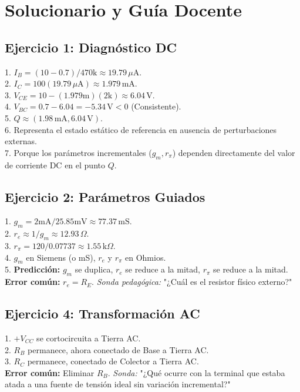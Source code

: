 \documentclass[11pt, a4paper]{article}
\begin{document}
\section*{Solucionario y Guía Docente}

\subsection*{Ejercicio 1: Diagnóstico DC}
1. $I_B = (10 - 0.7) / 470\text{k} \approx 19.79\,\mu\text{A}$. \\
2. $I_C = 100(19.79\,\mu\text{A}) \approx 1.979\,\text{mA}$. \\
3. $V_{CE} = 10 - (1.979\text{m})(2\text{k}) \approx 6.04\,\text{V}$. \\
4. $V_{BC} = 0.7 - 6.04 = -5.34\,\text{V} < 0$ (Consistente). \\
5. $Q \approx (1.98\,\text{mA}, 6.04\,\text{V})$. \\
6. Representa el estado estático de referencia en ausencia de perturbaciones externas. \\
7. Porque los parámetros incrementales ($g_m, r_\pi$) dependen directamente del valor de corriente DC en el punto $Q$.

\subsection*{Ejercicio 2: Parámetros Guiados}
1. $g_m = 2\text{mA} / 25.85\text{mV} \approx 77.37\,\text{mS}$. \\
2. $r_e \approx 1/g_m \approx 12.93\,\Omega$. \\
3. $r_\pi = 120 / 0.07737 \approx 1.55\,\text{k}\Omega$. \\
4. $g_m$ en Siemens (o mS), $r_e$ y $r_\pi$ en Ohmios. \\
5. \textbf{Predicción:} $g_m$ se duplica, $r_e$ se reduce a la mitad, $r_\pi$ se reduce a la mitad. \\
\textbf{Error común:} $r_e = R_E$. \textit{Sonda pedagógica:} "¿Cuál es el resistor físico externo?"

\subsection*{Ejercicio 4: Transformación AC}
1. $+V_{CC}$ se cortocircuita a Tierra AC. \\
2. $R_B$ permanece, ahora conectado de Base a Tierra AC. \\
3. $R_C$ permanece, conectado de Colector a Tierra AC. \\
\textbf{Error común:} Eliminar $R_B$. \textit{Sonda:} "¿Qué ocurre con la terminal que estaba atada a una fuente de tensión ideal sin variación incremental?"
\end{document}
